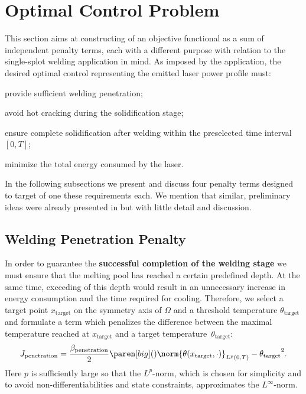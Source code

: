 \section{Optimal Control Problem}
\label{sec:optimal_control_problem}

This section aims at constructing of an objective functional as a sum of independent penalty terms, each with a different purpose with relation to the single-splot welding application in mind.
As imposed by the application, the desired optimal control representing the emitted laser power profile must:
\begin{enumeratearabic}
	\item 
		provide sufficient welding penetration;
	\item 
		avoid hot cracking during the solidification stage;
	\item 
		ensure complete solidification after welding within the preselected time interval~$[0,T]$;
	\item 
		minimize the total energy consumed by the laser.
\end{enumeratearabic}

In the following subsections we present and discuss four penalty terms designed to target of one these requirements each.
We mention that similar, preliminary ideas were already presented in \cite{BergmannBieleninHerzogHildebrandRiedelSchrickerTrunkWorthmann:2017:1} but with little detail and discussion.


\subsection{Welding Penetration Penalty}
\label{subsec:welding_penetration}

In order to guarantee the \textbf{successful completion of the welding stage} we must ensure that the melting pool has reached a certain predefined depth. 
At the same time, exceeding of this depth would result in an unnecessary increase in energy consumption and the time required for cooling.
Therefore, we select a target point $x_{\text{target}}$ on the symmetry axis of $\Omega$ and a threshold temperature $\theta_{\text{target}}$ and formulate a term which penalizes the difference between the maximal temperature reached at $x_{\text{target}}$ and a target temperature~$\theta_{\text{target}}$:
\begin{equation} \label{eq:J_penetration}
	J_\textup{penetration} 
	= 
	\frac{\beta_\textup{penetration}}{2} \paren[big](){\norm{\theta(x_{\text{target}},\cdot)}_{L^p(0,T)} - \theta_{\text{target}}}^2
	.
\end{equation}
Here $p$ is sufficiently large so that the $L^p$-norm, which is chosen for simplicity and to avoid non-differentiabilities and state constraints, approximates the $L^\infty$-norm.


